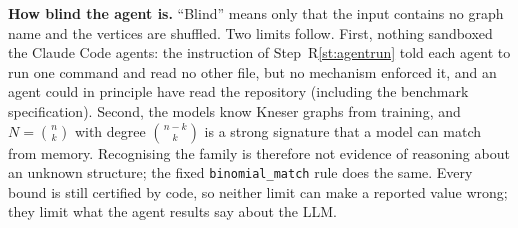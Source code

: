 \textbf{How blind the agent is.} ``Blind'' means only that the input contains no graph name and the vertices are
shuffled. Two limits follow. First, nothing sandboxed the Claude Code agents: the instruction of
Step~R\ref{st:agentrun} told each agent to run one command and read no other file, but no mechanism enforced it, and
an agent could in principle have read the repository (including the benchmark specification). Second, the models
know Kneser graphs from training, and $N=\binom nk$ with degree $\binom{n-k}{k}$ is a strong signature that a model
can match from memory. Recognising the family is therefore not evidence of reasoning about an unknown structure; the
fixed \texttt{binomial\_match} rule does the same. Every bound is still certified by code, so neither limit can make
a reported value wrong; they limit what the agent results say about the LLM.

